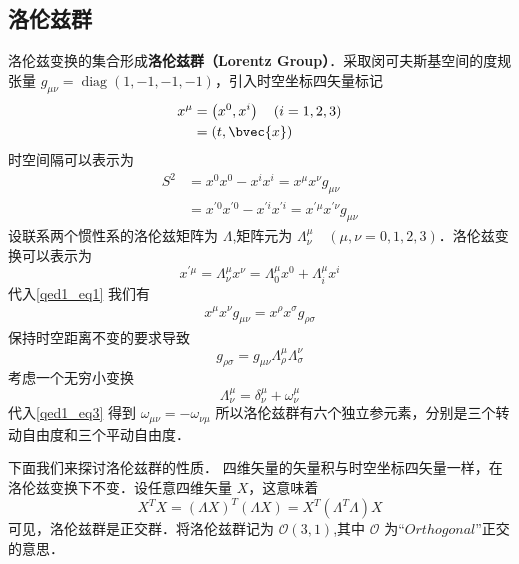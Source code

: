 \subsection{洛伦兹群}
洛伦兹变换的集合形成\textbf{洛伦兹群（Lorentz Group）}．采取闵可夫斯基空间的度规张量 $g_{\mu \nu}=\operatorname{diag}(1,-1,-1,-1)$，引入时空坐标四矢量标记
\begin{equation}
\begin{aligned}
x^{\mu} &=\left(x^{0}, x^{i}\right) \quad(i=1,2,3)\\
&=(t, \bvec{x})
\end{aligned}
\end{equation}
时空间隔可以表示为
\begin{equation}\label{qed1_eq1}\begin{aligned}
S^{2} &=x^{0} x^{0}-x^{i} x^{i}=x^{\mu} x^{\nu} g_{\mu \nu} \\
&=x^{\prime 0} x^{\prime 0}-x^{\prime i} x^{\prime i}=x^{\prime \mu} x^{\prime \nu} g_{\mu \nu}
\end{aligned}\end{equation}
设联系两个惯性系的洛伦兹矩阵为 $\Lambda$,矩阵元为 $\Lambda_{\nu}^{\mu}\quad(\mu,\nu=0,1,2,3)$．洛伦兹变换可以表示为
\begin{equation}\label{qed1_eq2}x^{\prime \mu}=\Lambda_{\nu}^{\mu} x^{\nu}=\Lambda_{0}^{\mu} x^{0}+\Lambda_{i}^{\mu} x^{i}\end{equation}
代入\autoref{qed1_eq1} 我们有
\begin{align}
x^{\mu} x^{\nu} g_{\mu \nu}=x^{\rho} x^{\sigma} g_{\rho \sigma}
\end{align}
保持时空距离不变的要求导致
\begin{equation}\label{qed1_eq3}g_{\rho \sigma}=g_{\mu \nu} \Lambda_{\rho}^{\mu} \Lambda_{\sigma}^{\nu}\end{equation}
考虑一个无穷小变换
\begin{equation}\Lambda_{\nu}^{\mu}=\delta_{\nu}^{\mu}+\omega_{\nu}^{\mu}\end{equation}
代入\autoref{qed1_eq3} 得到 $\omega_{\mu \nu}=-\omega_{\nu \mu}$
所以洛伦兹群有六个独立参元素，分别是三个转动自由度和三个平动自由度．

下面我们来探讨洛伦兹群的性质．
四维矢量的矢量积与时空坐标四矢量一样，在洛伦兹变换下不变．设任意四维矢量 $X$，这意味着
\begin{equation}
X^TX=(\Lambda X)^T(\Lambda X)=X^T(\Lambda^T\Lambda)X
\end{equation}
可见，洛伦兹群是正交群．将洛伦兹群记为 $\mathcal{O}(3,1)$,其中 $\mathcal{O}$ 为“$Orthogonal$”正交的意思．

